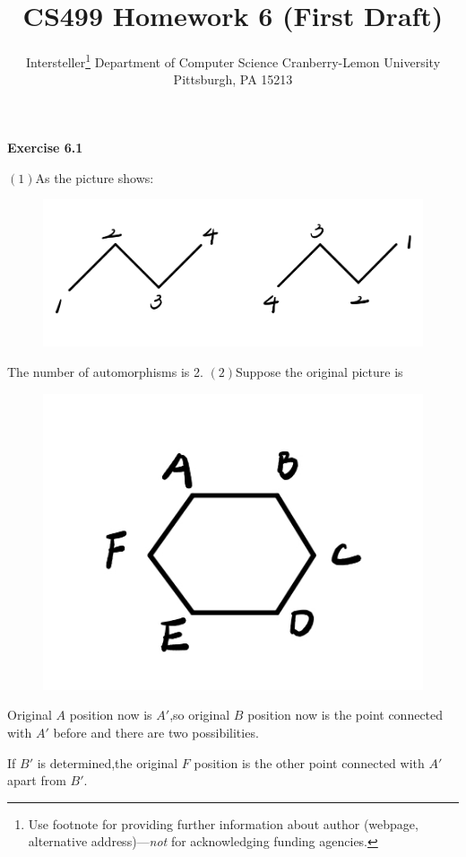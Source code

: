 \documentclass{article} %
\title{CS499 Homework 6 (First Draft)}
\author{
	Intersteller\thanks{ Use footnote for providing further information
		about author (webpage, alternative address)---\emph{not} for acknowledging
		funding agencies.}
	Department of Computer Science
	Cranberry-Lemon University
	Pittsburgh, PA 15213
}
\begin{document}
	\maketitle
	\textbf{Exercise 6.1}\par

    $(1)$As the picture shows:\par
    \begin{figure}[H]
		\centering
		\includegraphics[scale=0.3]{p31.jpg}
		\caption{}
		\label{fig:1}
	\end{figure}
	The number of automorphisms is 2.
    $(2)$Suppose the original picture is\par
    \begin{figure}[H]
		\centering
		\includegraphics[scale=0.4]{p32.jpg}
		\caption{}
		\label{fig:2}
	\end{figure}
    Original $A$ position now is $A'$,so original $B$ position now is the point connected with $A'$ before and there are two possibilities.\par
    If $B'$ is determined,the original $F$ position is the other point connected with $A'$ apart from $B'$.\par
\end{document}
